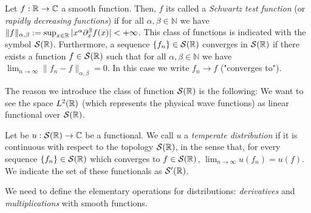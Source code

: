  
 \begin{definition}
 	Let $f:{\mathbb R}\to {\mathbb C}$ a smooth function. Then, $f$ its called a \textit{Schwartz test function} (or \textit{rapidly decreasing functions}) if for all $\alpha,\beta\in\mathbb{N}$ we have $\|f\|_{\alpha,\beta}:=\sup_{x\in{\mathbb R}}|x^\alpha\partial_x^\beta f(x)|<+\infty$. This class of functions is indicated with the symbol $\mathcal{S}({\mathbb R})$. Furthermore, a sequence $\{f_n\}\in\mathcal{S}({\mathbb R})$ converges in $\mathcal{S}({\mathbb R})$ if there exists a function $f\in\mathcal{S}({\mathbb R})$ such that for all $\alpha,\beta\in\mathbb{N}$ we have $\lim_{n\to\infty}\|f_n-f\|_{\alpha,\beta}=0$. In this case we write $f_n\to f$ ("converges to").
  \end{definition}
  \begin{oss}
  	The reason we introduce the class of function $\mathcal{S}({\mathbb R})$ is the following: We want to see the space $L^2({\mathbb R})$ (which represents the physical wave functions) as linear functional over $\mathcal{S}({\mathbb R})$.
  \end{oss}
  
  \begin{definition}
  	Let be $u:\mathcal{S}({\mathbb R})\to{\mathbb C}$ be a functional. We call $u$ a \textit{temperate distribution} if it is continuous with respect to the topology $\mathcal{S}({\mathbb R})$, in the sense that, for every sequence $\{f_n\}\in\mathcal{S}({\mathbb R})$ which converges to $f\in\mathcal{S}({\mathbb R})$, $\lim_{n\to\infty} u(f_n)=u(f)$. We indicate the set of these functionals as $\mathcal{S}'({\mathbb R})$.
  	\end{definition}
  	
  	We need to define the elementary operations for distributions: \textit{derivatives} and \textit{multiplications} with smooth functions.
  	
